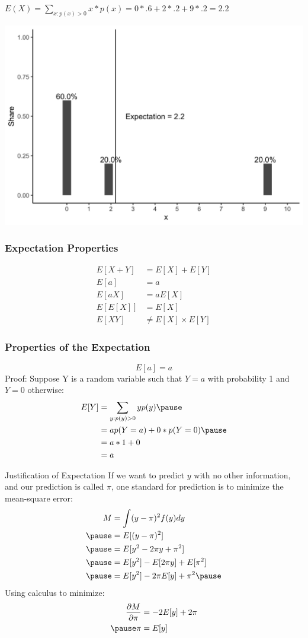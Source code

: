 \documentclass[aspectratio=169, handout]{beamer}
\numberwithin{equation}{section}
\begin{document}
\begin{frame}{$E(X)= \sum_{x:p(x)>0} x* p(x) =0*.6+2*.2+9*.2= 2.2$}

\begin{center}
\includegraphics[width=3.5 in]{images/plot3.png}
\end{center}

\end{frame}


\begin{frame}
\frametitle{Expectation Properties}
\begin{align*}
E[X+Y]&=E[X]+E[Y]\\
E[a]&=a\\
E[aX]&=aE[X]\\
E[E[X]]&=E[X]\\
E[XY]&\neq E[X]\times E[Y]
\end{align*}
\end{frame}


\begin{frame}
\frametitle{Properties of the Expectation}
$$E[a]=a$$\pause 
Proof:  Suppose Y is a random variable such that $Y = a$ with probability 1 and $Y= 0$ otherwise:
\begin{align*}
E[Y] &= \sum_{y: p(y)>0} y p(y) \pause\\
&= a p(Y=a)+ 0* p(Y=0) \pause\\
&= a*1  + 0  \\
&= a 
\end{align*}


\end{frame}


\begin{frame}{Justification of Expectation}
If we want to predict $y$ with no other information, and our prediction is called $\pi$, one standard for prediction is to minimize the mean-square error:
\begin{align*}
M &= \int (y -\pi)^2 f(y) dy\\\pause
&=E[(y-\pi)^2]\\\pause
&=E[y^2-2\pi y+\pi^2]\\\pause
&=E[y^2]-E[2\pi y]+E[\pi^2]\\\pause
&=E[y^2]-2\pi E[y]+ \pi^2\pause
\end{align*}
Using calculus to minimize:\pause
\begin{align*}
\frac{\partial M}{\partial \pi}&=-2E[y]+ 2\pi\\\pause
\pi&=E[y]
\end{align*}
\end{frame}
\end{document}
